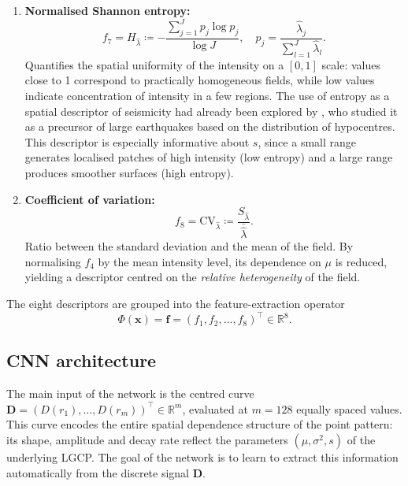 \documentclass[a4paper,fleqn]{cas-sc}
\numberwithin{equation}{section}
\begin{document}
\begin{enumerate}[label=(\roman*),leftmargin=*,itemsep=0.6em]
\item \textbf{Normalised Shannon entropy:}
\begin{equation}
f_7 = H_{\hat{\lambda}} \coloneqq
    -\frac{\sum_{j=1}^{J} p_j\log p_j}{\log J}, \quad
    p_j = \frac{\hat{\lambda}_j}{\sum_{l=1}^{J}\hat{\lambda}_l}.
\label{eq:f7_entropy}
\end{equation}
Quantifies the spatial uniformity of the intensity on a $[0,1]$ scale:
values close to 1 correspond to practically homogeneous fields, while
low values indicate concentration of intensity in a few regions. The
use of entropy as a spatial descriptor of seismicity had already been
explored by \citet{Despaigne2017}, who studied it as a precursor of
large earthquakes based on the distribution of hypocentres. This
descriptor is especially informative about $s$, since a small range
generates localised patches of high intensity (low entropy) and a
large range produces smoother surfaces (high entropy).

\item \textbf{Coefficient of variation:}
\begin{equation}
f_8 = \mathrm{CV}_{\hat{\lambda}} \coloneqq
    \frac{S_{\hat{\lambda}}}{\bar{\hat{\lambda}}}.
\label{eq:f8_cv}
\end{equation}
Ratio between the standard deviation and the mean of the field. By
normalising $f_4$ by the mean intensity level, its dependence on
$\mu$ is reduced, yielding a descriptor centred on the \emph{relative
heterogeneity} of the field.
\end{enumerate}

The eight descriptors are grouped into the feature-extraction operator
\begin{equation}
    \Phi(\mathbf{x}) = \mathbf{f} =
    (f_1,f_2,\ldots,f_{8})^{\top} \in \mathbb{R}^{8}.
    \label{eq:phi}
\end{equation}

\subsection{CNN architecture}
\label{sec:cnn_extended}

The main input of the network is the centred curve
$\mathbf{D}=(D(r_1),\ldots,D(r_m))^{\top}\in\mathbb{R}^{m}$, evaluated
at $m=128$ equally spaced values. This curve encodes the entire
spatial dependence structure of the point pattern: its shape,
amplitude and decay rate reflect the parameters $(\mu,\sigma^2,s)$ of
the underlying LGCP. The goal of the network is to learn to extract
this information automatically from the discrete signal $\mathbf{D}$.
\end{document}
